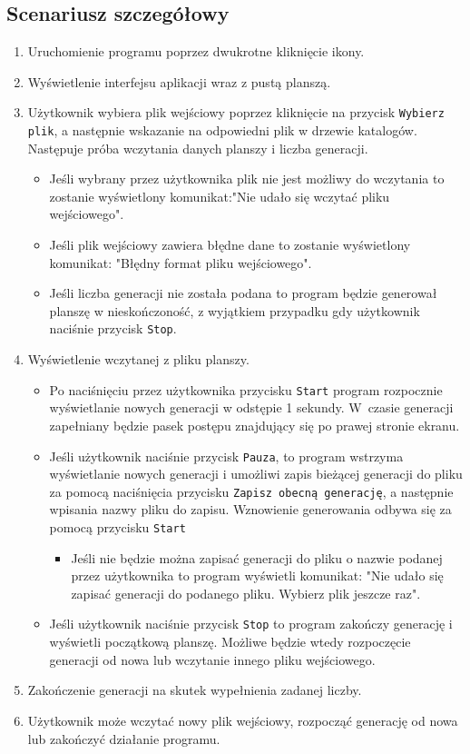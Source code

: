 \documentclass[a4paper,11pt, notitlepage ]{article}
\begin{document}
\subsection{Scenariusz szczegółowy}
\begin{enumerate}
\item Uruchomienie programu poprzez dwukrotne kliknięcie ikony.
\item Wyświetlenie interfejsu aplikacji wraz z pustą planszą.
\item Użytkownik wybiera plik wejściowy poprzez kliknięcie na przycisk \verb+Wybierz+ \verb+plik+, a następnie wskazanie na odpowiedni plik w drzewie katalogów. Następuje próba wczytania danych planszy i liczba generacji.
\begin{itemize}
\item Jeśli wybrany przez użytkownika plik nie jest możliwy do wczytania to zostanie wyświetlony komunikat:"Nie udało się wczytać pliku wejściowego".
\item Jeśli plik wejściowy zawiera błędne dane to zostanie wyświetlony komunikat: "Błędny format pliku wejściowego".
\item Jeśli liczba generacji nie została podana to program będzie generował planszę w nieskończoność, z wyjątkiem przypadku gdy użytkownik naciśnie przycisk \verb+Stop+.
\end{itemize}
\item Wyświetlenie wczytanej z pliku planszy.
\begin{itemize}
\item Po naciśnięciu przez użytkownika przycisku \verb+Start+ program rozpocznie wyświetlanie nowych generacji w odstępie 1 sekundy. W~czasie generacji zapełniany będzie pasek postępu znajdujący się po prawej stronie ekranu.
\item Jeśli użytkownik naciśnie przycisk \verb+Pauza+, to program wstrzyma wyświetlanie nowych generacji i umożliwi zapis bieżącej generacji do pliku za pomocą naciśnięcia przycisku \verb+Zapisz obecną generację+, a następnie wpisania nazwy pliku do zapisu. Wznowienie generowania odbywa się za pomocą przycisku \verb+Start+
\begin{itemize}
\item Jeśli nie będzie można zapisać generacji do pliku o nazwie podanej przez użytkownika to program wyświetli komunikat: "Nie udało się zapisać generacji do podanego  pliku. Wybierz plik jeszcze raz".
\end{itemize}
\item Jeśli użytkownik naciśnie przycisk \verb+Stop+ to program zakończy generację i wyświetli początkową planszę. Możliwe będzie wtedy rozpoczęcie generacji od nowa lub wczytanie innego pliku wejściowego.
\end{itemize}
\item Zakończenie generacji na skutek wypełnienia zadanej liczby.
\item Użytkownik może wczytać nowy plik wejściowy, rozpocząć generację od nowa lub zakończyć działanie programu.
\end{enumerate}
\end{document}
